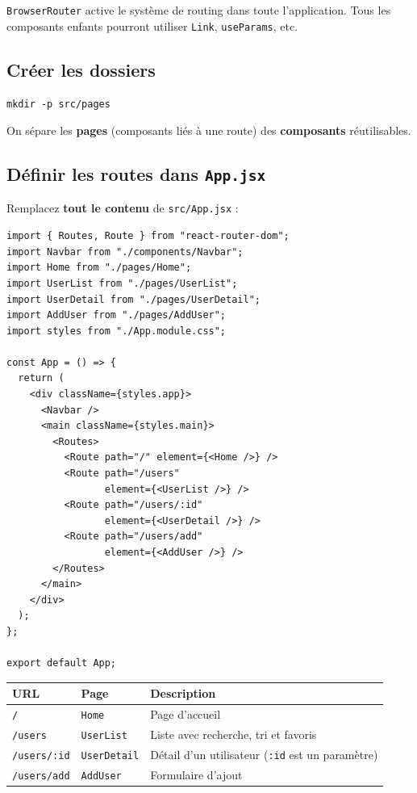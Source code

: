 \documentclass[11pt,a4paper]{article}
\begin{document}
\texttt{BrowserRouter} active le système de routing dans toute l'application. Tous les composants enfants pourront utiliser \texttt{Link}, \texttt{useParams}, etc.

\subsection{Créer les dossiers}

\begin{lstlisting}[style=terminal]
mkdir -p src/pages
\end{lstlisting}

On sépare les \textbf{pages} (composants liés à une route) des \textbf{composants} réutilisables.

\subsection{Définir les routes dans \texttt{App.jsx}}

Remplacez \textbf{tout le contenu} de \texttt{src/App.jsx} :

\begin{lstlisting}
import { Routes, Route } from "react-router-dom";
import Navbar from "./components/Navbar";
import Home from "./pages/Home";
import UserList from "./pages/UserList";
import UserDetail from "./pages/UserDetail";
import AddUser from "./pages/AddUser";
import styles from "./App.module.css";

const App = () => {
  return (
    <div className={styles.app}>
      <Navbar />
      <main className={styles.main}>
        <Routes>
          <Route path="/" element={<Home />} />
          <Route path="/users"
                 element={<UserList />} />
          <Route path="/users/:id"
                 element={<UserDetail />} />
          <Route path="/users/add"
                 element={<AddUser />} />
        </Routes>
      </main>
    </div>
  );
};

export default App;
\end{lstlisting}

\begin{retenirbox}
\begin{center}
\begin{tabular}{llp{5.5cm}}
\toprule
\textbf{URL} & \textbf{Page} & \textbf{Description} \\
\midrule
\texttt{/} & \texttt{Home} & Page d'accueil \\
\texttt{/users} & \texttt{UserList} & Liste avec recherche, tri et favoris \\
\texttt{/users/:id} & \texttt{UserDetail} & Détail d'un utilisateur (\texttt{:id} est un paramètre) \\
\texttt{/users/add} & \texttt{AddUser} & Formulaire d'ajout \\
\bottomrule
\end{tabular}
\end{center}
\end{retenirbox}
\end{document}
